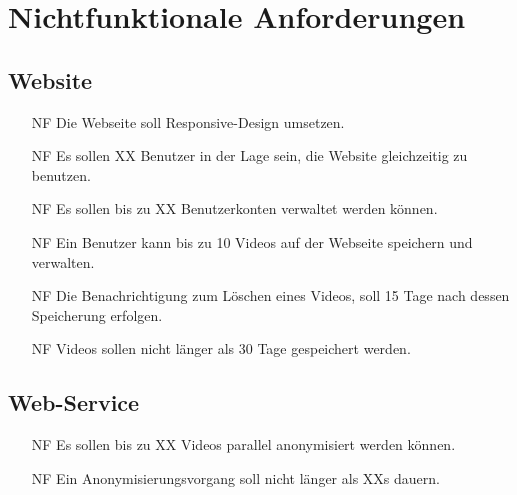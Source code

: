 \chapter{Nichtfunktionale Anforderungen}

\section{Website}
\begin{itemize}
\item[NF] Die Webseite soll Responsive-Design umsetzen.

\item[NF] Es sollen XX Benutzer in der Lage sein, die Website gleichzeitig zu benutzen.

\item[NF] Es sollen bis zu XX Benutzerkonten verwaltet werden können.

\item[NF] Ein Benutzer kann bis zu 10 Videos auf der Webseite speichern und verwalten.

\item[NF] Die Benachrichtigung zum Löschen eines Videos, soll 15 Tage nach dessen Speicherung erfolgen.

\item[NF] Videos sollen nicht länger als 30 Tage gespeichert werden.

\end{itemize}

\section{Web-Service}
\begin{itemize}

\item[NF] Es sollen bis zu XX Videos parallel anonymisiert werden können.

\item[NF] Ein Anonymisierungsvorgang soll nicht länger als XXs dauern.
\end{itemize}

